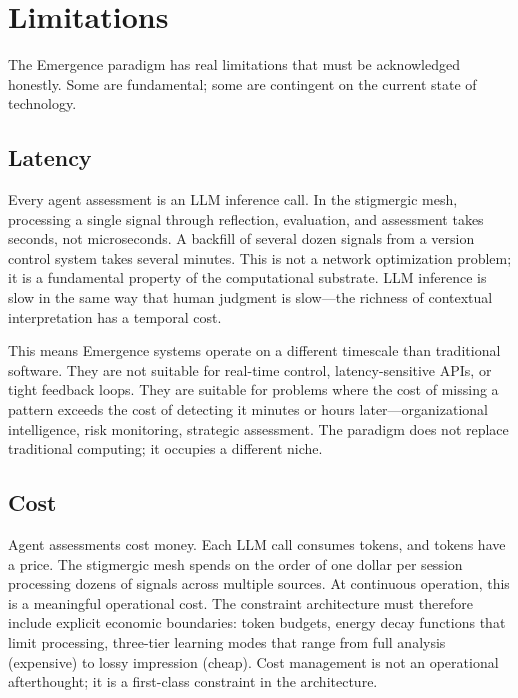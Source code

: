 \documentclass[11pt,twocolumn]{article}
\begin{document}
\section{Limitations}
\label{sec:limitations}

The Emergence paradigm has real limitations that must be acknowledged
honestly.  Some are fundamental; some are contingent on the current
state of technology.

\subsection{Latency}

Every agent assessment is an LLM inference call.  In the stigmergic
mesh, processing a single signal through reflection, evaluation, and
assessment takes seconds, not microseconds.  A backfill of several dozen signals
from a version control system takes several minutes.  This is not a network optimization
problem; it is a fundamental property of the computational substrate.
LLM inference is slow in the same way that human judgment is slow---the
richness of contextual interpretation has a temporal cost.

This means Emergence systems operate on a different timescale than
traditional software.  They are not suitable for real-time control,
latency-sensitive APIs, or tight feedback loops.  They are suitable for
problems where the cost of missing a pattern exceeds the cost of
detecting it minutes or hours later---organizational intelligence,
risk monitoring, strategic assessment.  The paradigm does not replace
traditional computing; it occupies a different niche.

\subsection{Cost}

Agent assessments cost money.  Each LLM call consumes tokens, and
tokens have a price.  The stigmergic mesh spends on the order of one dollar
per session processing dozens of signals across multiple sources.  At
continuous operation, this is a meaningful operational cost.  The
constraint architecture must therefore include explicit economic
boundaries: token budgets, energy decay functions that limit processing,
three-tier learning modes that range from full analysis (expensive) to
lossy impression (cheap).  Cost management is not an operational
afterthought; it is a first-class constraint in the architecture.
\end{document}
